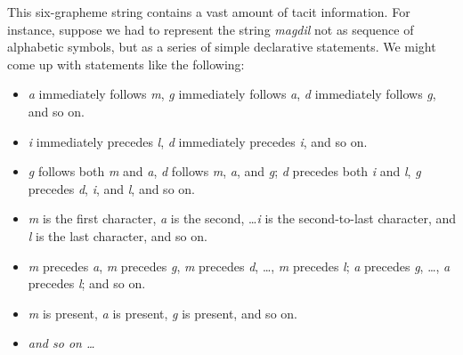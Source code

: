This six-grapheme string contains a vast amount of tacit information. For instance, 
suppose we had to represent the string \textit{magdil} not as sequence of alphabetic 
symbols, but as a series of simple declarative statements. We might come up with 
statements like the following: 
\begin{itemize}
  \item \textit{a} immediately follows \textit{m}, \textit{g} immediately follows \textit{a}, \textit{d} immediately follows \textit{g}, and so on. 
  \item \textit{i} immediately precedes \textit{l}, \textit{d} immediately precedes \textit{i}, and so on. %
   \item \textit{g} follows both \textit{m} and \textit{a}, \textit{d} follows \textit{m}, \textit{a}, and \textit{g}; \textit{d} precedes both \textit{i} and \textit{l}, \textit{g} precedes \textit{d}, \textit{i}, and \textit{l}, and so on.
   \item \textit{m} is the first character, \textit{a} is the second, \dots \textit{i} is the second-to-last character, and \textit{l} is the last character, and so on.
   \item \textit{m} precedes \textit{a}, \textit{m} precedes \textit{g}, \textit{m} precedes \textit{d}, \dots, \textit{m} precedes \textit{l}; \textit{a} precedes \textit{g}, \dots , \textit{a} precedes \textit{l}; and so on.
   \item \textit{m} is present, \textit{a} is present, \textit{g} is present, and so on.
   \item \emph{and so on \dots}
\end{itemize}
